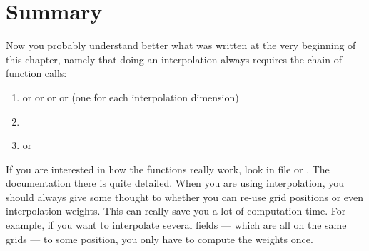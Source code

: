\section{Summary}

Now you probably understand better what was written at the very
beginning of this chapter, namely that doing an interpolation always
requires the chain of function calls:
\begin{enumerate}
\item {} or  or  or  or  (one for each interpolation dimension)
\item {}
\item {} or 
\end{enumerate}
If you are interested in how the functions really work, look in file
 or .
The documentation there is quite detailed.  When you are using
interpolation, you should always give some thought to whether you can
re-use grid positions or even interpolation weights. This can really
save you a lot of computation time. For example, if you want to
interpolate several fields --- which are all on the same grids --- to
some position, you only have to compute the weights once.



